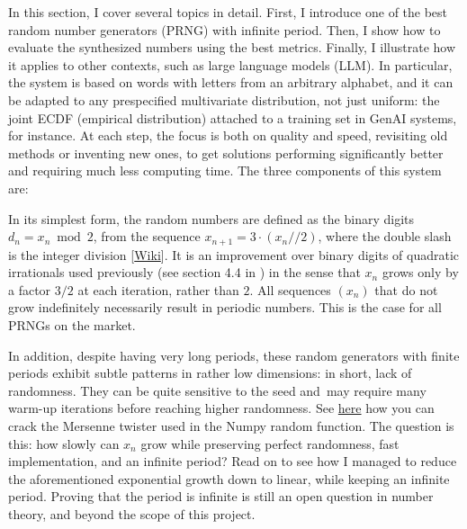 \documentclass[oneside,10pt]{book}
\begin{document}
In this section, I cover several topics in detail. First, I introduce one of the best 
\textcolor{index}{random number generators} (PRNG) with infinite period. Then,
 I show how to evaluate the synthesized numbers using the best metrics. Finally, I illustrate how it applies to
 other contexts, such as \textcolor{index}{large language models} (LLM). In particular,
 the system is based on words with letters from an arbitrary alphabet, and it can be adapted to any prespecified 
 multivariate distribution, not just uniform: the joint ECDF  (\textcolor{index}{empirical distribution}) attached to a training set in \textcolor{index}{GenAI} systems, for instance.
At each step, the focus is both on quality and speed, 
revisiting old methods or inventing new ones, to get solutions performing significantly better and requiring much less computing time. The three components of this system are:
\vspace{1ex}


\noindent In its simplest form, the random numbers are defined as the binary digits $d_n = x_n\bmod{2}$, from 
 the sequence $x_{n+1} = 3 \cdot (x_n // 2)$, where the double slash is the \textcolor{index}{integer division} [\href{https://mathworld.wolfram.com/IntegerDivision.html}{Wiki}]. It is an improvement over binary digits of quadratic irrationals used previously
 (see section 4.4 in \cite{vgchaos}) in the sense that $x_n$ grows only by a factor $3/2$ at each iteration, rather than $2$. All
 sequences $(x_n)$ that do not grow indefinitely necessarily result in periodic numbers. This is the case for all PRNGs on the market.
 
In addition, despite having very long periods, these random generators with finite periods exhibit subtle patterns  in rather low dimensions: in short, lack of randomness. They can be quite sensitive to the \textcolor{index}{seed} and~may require many warm-up iterations before reaching higher randomness. See 
\href{https://github.com/tna0y/Python-random-module-cracker}{here}
how you can crack the
\textcolor{index}{Mersenne twister} used in the Numpy random function.
 The question is this: how slowly can $x_n$ grow while preserving perfect randomness, fast implementation, and an infinite period? Read on to see how I managed to reduce the aforementioned exponential growth down to linear, while keeping an infinite period. Proving that the period is infinite is still an open question in number theory, and beyond the scope of this project. 
\vspace{1ex}
\end{document}

